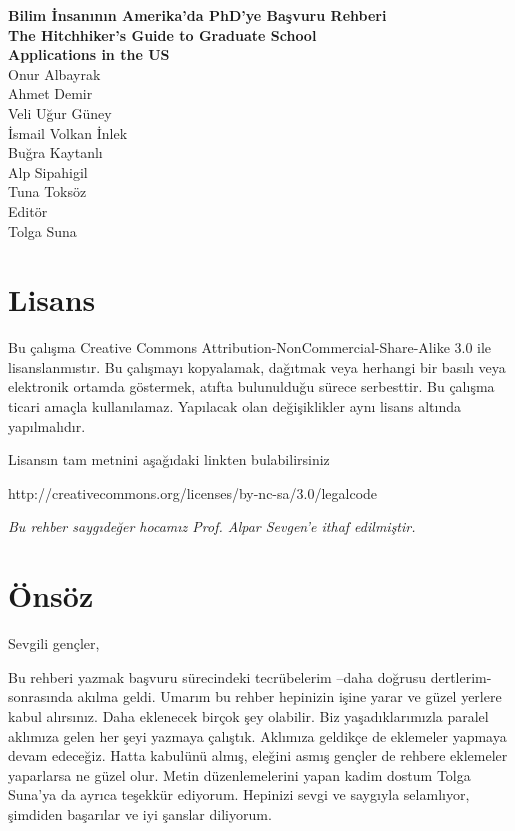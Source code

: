 \documentclass[12pt]{article}
\begin{document}
%
%
\thispagestyle{empty}
\setcounter{page}{0}
\begin{center}
\textbf{\Huge{Bilim İnsanının Amerika'da PhD'ye Başvuru Rehberi} \\
\vspace{8mm}
\Large{The Hitchhiker's Guide to Graduate School \\
\vspace{4mm}
Applications in the US }}\\

\vspace{100mm}
\Large{Onur Albayrak} 
\\
Ahmet Demir
\\
Veli Uğur Güney 
\\
İsmail Volkan İnlek
\\
Buğra Kaytanlı 
\\
Alp Sipahigil 
\\
Tuna Toksöz 
\\
\vspace{8mm}
\large{
Editör 
\\
Tolga Suna }
\end{center}
%
%
\newpage
\section*{Lisans}

Bu çalışma Creative Commons Attribution-NonCommercial-Share-Alike 3.0 ile lisanslanmıstır. Bu çalışmayı kopyalamak, dağıtmak veya herhangi bir basılı veya elektronik ortamda göstermek, atıfta bulunulduğu sürece serbesttir. Bu çalışma ticari amaçla kullanılamaz. Yapılacak olan değişiklikler aynı lisans altında yapılmalıdır. 

Lisansın tam metnini aşağıdaki linkten bulabilirsiniz

http://creativecommons.org/licenses/by-nc-sa/3.0/legalcode

\byncsa
\newpage
%
%
\vspace*{45mm} 
\textit{Bu rehber saygıdeğer hocamız Prof. Alpar Sevgen'e ithaf edilmiştir.}
%
\newpage
%
%
\tableofcontents
%
\newpage

%
%
\section{Önsöz}
Sevgili gençler,

Bu rehberi yazmak başvuru sürecindeki tecrübelerim –daha doğrusu dertlerim- sonrasında akılma geldi. Umarım bu rehber hepinizin işine yarar ve güzel yerlere kabul alırsınız. Daha eklenecek birçok şey olabilir. Biz yaşadıklarımızla paralel aklımıza gelen her şeyi yazmaya çalıştık. Aklımıza geldikçe de eklemeler yapmaya devam edeceğiz. Hatta kabulünü almış, eleğini asmış gençler de rehbere eklemeler yaparlarsa ne güzel olur. Metin düzenlemelerini yapan kadim dostum Tolga Suna’ya da ayrıca teşekkür ediyorum. Hepinizi sevgi ve saygıyla selamlıyor, şimdiden başarılar ve iyi şanslar diliyorum.
\end{document}

